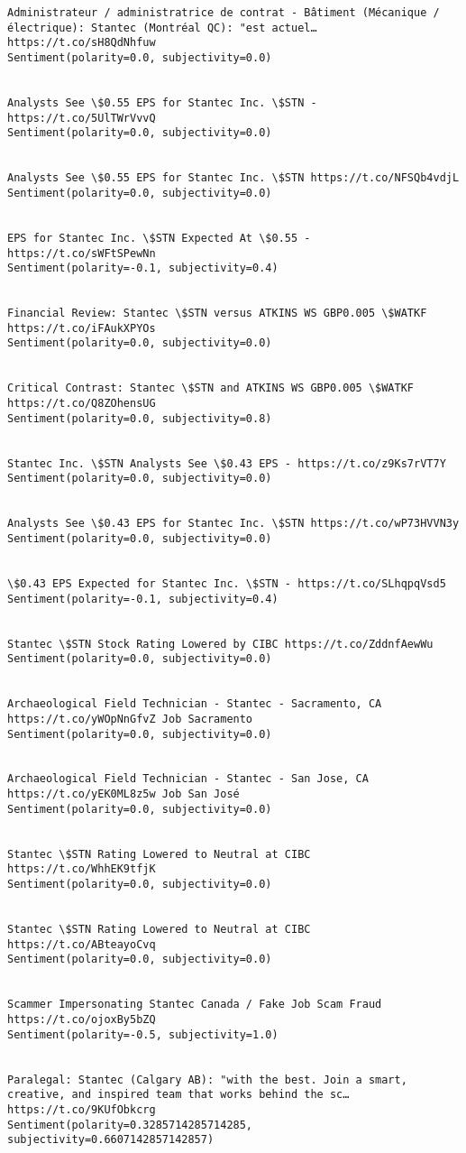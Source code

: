 \documentclass[11pt]{article}
\begin{document}
\begin{Verbatim}[commandchars=\\\{\}]
Administrateur / administratrice de contrat - Bâtiment (Mécanique / électrique): Stantec (Montréal QC): "est actuel… https://t.co/sH8QdNhfuw
Sentiment(polarity=0.0, subjectivity=0.0)


Analysts See \$0.55 EPS for Stantec Inc. \$STN - https://t.co/5UlTWrVvvQ
Sentiment(polarity=0.0, subjectivity=0.0)


Analysts See \$0.55 EPS for Stantec Inc. \$STN https://t.co/NFSQb4vdjL
Sentiment(polarity=0.0, subjectivity=0.0)


EPS for Stantec Inc. \$STN Expected At \$0.55 - https://t.co/sWFtSPewNn
Sentiment(polarity=-0.1, subjectivity=0.4)


Financial Review: Stantec \$STN versus ATKINS WS GBP0.005 \$WATKF https://t.co/iFAukXPYOs
Sentiment(polarity=0.0, subjectivity=0.0)


Critical Contrast: Stantec \$STN and ATKINS WS GBP0.005 \$WATKF https://t.co/Q8ZOhensUG
Sentiment(polarity=0.0, subjectivity=0.8)


Stantec Inc. \$STN Analysts See \$0.43 EPS - https://t.co/z9Ks7rVT7Y
Sentiment(polarity=0.0, subjectivity=0.0)


Analysts See \$0.43 EPS for Stantec Inc. \$STN https://t.co/wP73HVVN3y
Sentiment(polarity=0.0, subjectivity=0.0)


\$0.43 EPS Expected for Stantec Inc. \$STN - https://t.co/SLhqpqVsd5
Sentiment(polarity=-0.1, subjectivity=0.4)


Stantec \$STN Stock Rating Lowered by CIBC https://t.co/ZddnfAewWu
Sentiment(polarity=0.0, subjectivity=0.0)


Archaeological Field Technician - Stantec - Sacramento, CA https://t.co/yWOpNnGfvZ Job Sacramento
Sentiment(polarity=0.0, subjectivity=0.0)


Archaeological Field Technician - Stantec - San Jose, CA https://t.co/yEK0ML8z5w Job San José
Sentiment(polarity=0.0, subjectivity=0.0)


Stantec \$STN Rating Lowered to Neutral at CIBC https://t.co/WhhEK9tfjK
Sentiment(polarity=0.0, subjectivity=0.0)


Stantec \$STN Rating Lowered to Neutral at CIBC https://t.co/ABteayoCvq
Sentiment(polarity=0.0, subjectivity=0.0)


Scammer Impersonating Stantec Canada / Fake Job Scam Fraud https://t.co/ojoxBy5bZQ
Sentiment(polarity=-0.5, subjectivity=1.0)


Paralegal: Stantec (Calgary AB): "with the best. Join a smart, creative, and inspired team that works behind the sc… https://t.co/9KUfObkcrg
Sentiment(polarity=0.3285714285714285, subjectivity=0.6607142857142857)



\end{Verbatim}
\end{document}

